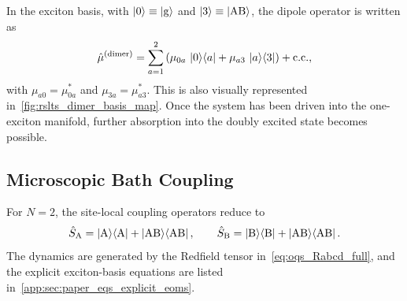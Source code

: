 In the exciton basis, with \(\ket{0}\equiv\ket{\mathrm{g}}\) and
\(\ket{3}\equiv\ket{\mathrm{AB}}\), the dipole operator is written as
\begin{equation*}
\hat{\mu}^{(\mathrm{dimer})}
=
\sum_{a=1}^{2}
\left(\mu_{0a}\,\ket{0}\!\bra{a}
+
\mu_{a3}\,\ket{a}\!\bra{3}
\right)+
\text{c.c.},
\end{equation*}
with \(\mu_{a0}=\mu_{0a}^{*}\) and \(\mu_{3a}=\mu_{a3}^{*}\). This is also
visually represented in~\autoref{fig:rslts_dimer_basis_map}.
Once the system has been driven into the one-exciton manifold, further
absorption into the doubly excited state becomes possible.

\subsection{Microscopic Bath Coupling}
\label{sec:model_dimer_transfer_model}

For \(N=2\), the site-local coupling operators reduce to
\begin{equation*}
\hat{S}_{\mathrm{A}} = \ket{\mathrm{A}}\!\bra{\mathrm{A}} + \ket{\mathrm{AB}}\!\bra{\mathrm{AB}},
\qquad
\hat{S}_{\mathrm{B}} = \ket{\mathrm{B}}\!\bra{\mathrm{B}} + \ket{\mathrm{AB}}\!\bra{\mathrm{AB}}.
\end{equation*}
The dynamics are generated by the Redfield tensor in~\autoref{eq:oqs_Rabcd_full},
and the explicit exciton-basis equations are listed
in~\autoref{app:sec:paper_eqs_explicit_eoms}.
